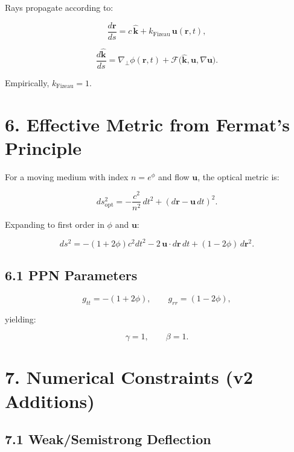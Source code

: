 \documentclass{article}
\begin{document}
Rays propagate according to:



\[
\frac{d\mathbf r}{ds}
= c\,\hat{\mathbf k}
+ k_{\mathrm{Fizeau}}\,\mathbf u(\mathbf r,t),
\]





\[
\frac{d\hat{\mathbf k}}{ds}
= \nabla_\perp \phi(\mathbf r,t)
+ \mathcal{F}\big(\hat{\mathbf k}, \mathbf u, \nabla \mathbf u\big).
\]



Empirically, $k_{\mathrm{Fizeau}} = 1$.

\section*{6. Effective Metric from Fermat’s Principle}

For a moving medium with index $n = e^\phi$ and flow $\mathbf u$, the optical
metric is:



\[
ds_{\mathrm{opt}}^2
=
-\frac{c^2}{n^2}\,dt^2
+
\left(d\mathbf r - \mathbf u\,dt\right)^2.
\]



Expanding to first order in $\phi$ and $\mathbf u$:



\[
ds^2
=
-(1 + 2\phi)c^2 dt^2
- 2\,\mathbf u\cdot d\mathbf r\,dt
+
(1 - 2\phi)\,d\mathbf r^2.
\]



\subsection*{6.1 PPN Parameters}



\[
g_{tt} = -(1 + 2\phi),
\qquad
g_{rr} = (1 - 2\phi),
\]



yielding:



\[
\gamma = 1,
\qquad
\beta = 1.
\]



\section*{7. Numerical Constraints (v2 Additions)}

\subsection*{7.1 Weak/Semistrong Deflection}
\end{document}
